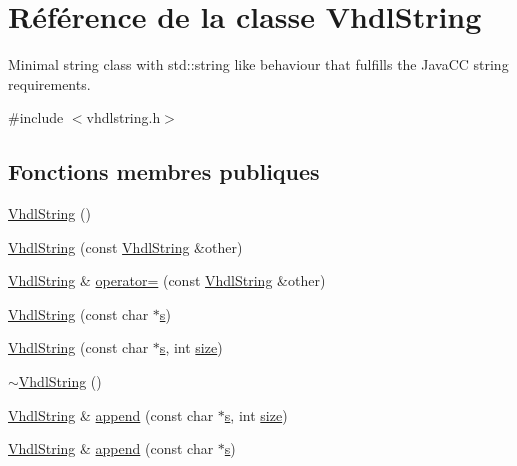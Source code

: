 \hypertarget{class_vhdl_string}{}\section{Référence de la classe Vhdl\+String}
\label{class_vhdl_string}


Minimal string class with std\+::string like behaviour that fulfills the Java\+C\+C string requirements.  




{\ttfamily \#include $<$vhdlstring.\+h$>$}

\subsection*{Fonctions membres publiques}
\begin{DoxyCompactItemize}
\item 
\hyperlink{class_vhdl_string_ad1747afcb0d13f711688ab21ae32fe9e}{Vhdl\+String} ()
\item 
\hyperlink{class_vhdl_string_a8fe423bc361c8030dc9f6ba110d87141}{Vhdl\+String} (const \hyperlink{class_vhdl_string}{Vhdl\+String} \&other)
\item 
\hyperlink{class_vhdl_string}{Vhdl\+String} \& \hyperlink{class_vhdl_string_ae3c975354c2e551238394e2966f15999}{operator=} (const \hyperlink{class_vhdl_string}{Vhdl\+String} \&other)
\item 
\hyperlink{class_vhdl_string_ac1475e34a382d8691a23ac4e1d25e379}{Vhdl\+String} (const char $\ast$\hyperlink{060__command__switch_8tcl_a011c73f2dbb87635a3b4206c72355f6e}{s})
\item 
\hyperlink{class_vhdl_string_ab0fb86df3d26cfde46f9822599a53269}{Vhdl\+String} (const char $\ast$\hyperlink{060__command__switch_8tcl_a011c73f2dbb87635a3b4206c72355f6e}{s}, int \hyperlink{class_vhdl_string_a145a2564c0030411267a2ceda23148a7}{size})
\item 
\hyperlink{class_vhdl_string_a1e13bd31dbfa44d0607fb9383e413fbb}{$\sim$\+Vhdl\+String} ()
\item 
\hyperlink{class_vhdl_string}{Vhdl\+String} \& \hyperlink{class_vhdl_string_afa4734698d424fe3aa51f828a4f52446}{append} (const char $\ast$\hyperlink{060__command__switch_8tcl_a011c73f2dbb87635a3b4206c72355f6e}{s}, int \hyperlink{class_vhdl_string_a145a2564c0030411267a2ceda23148a7}{size})
\item 
\hyperlink{class_vhdl_string}{Vhdl\+String} \& \hyperlink{class_vhdl_string_a2ccc401ac9c92eae61386019e9539cd6}{append} (const char $\ast$\hyperlink{060__command__switch_8tcl_a011c73f2dbb87635a3b4206c72355f6e}{s})

\end{DoxyCompactItemize}
